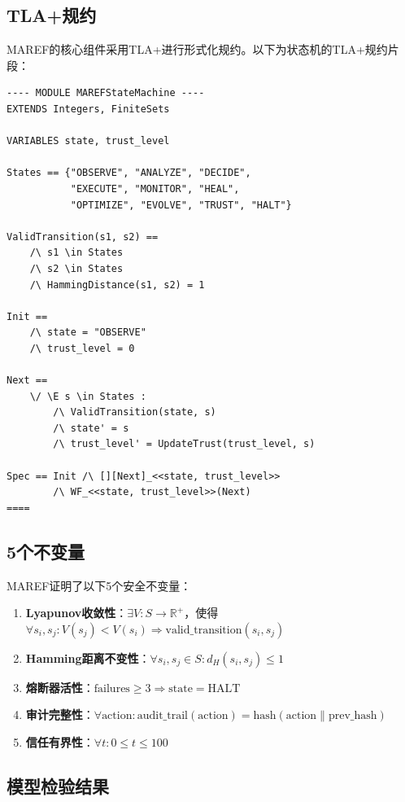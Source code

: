 \subsection{TLA+规约}

MAREF的核心组件采用TLA+进行形式化规约。以下为状态机的TLA+规约片段：

\begin{verbatim}
---- MODULE MAREFStateMachine ----
EXTENDS Integers, FiniteSets

VARIABLES state, trust_level

States == {"OBSERVE", "ANALYZE", "DECIDE", 
           "EXECUTE", "MONITOR", "HEAL",
           "OPTIMIZE", "EVOLVE", "TRUST", "HALT"}

ValidTransition(s1, s2) ==
    /\ s1 \in States
    /\ s2 \in States
    /\ HammingDistance(s1, s2) = 1

Init == 
    /\ state = "OBSERVE"
    /\ trust_level = 0

Next ==
    \/ \E s \in States : 
        /\ ValidTransition(state, s)
        /\ state' = s
        /\ trust_level' = UpdateTrust(trust_level, s)

Spec == Init /\ [][Next]_<<state, trust_level>>
        /\ WF_<<state, trust_level>>(Next)
====
\end{verbatim}

\subsection{5个不变量}

MAREF证明了以下5个安全不变量：

\begin{enumerate}
    \item \textbf{Lyapunov收敛性}：$\exists V: S \rightarrow \mathbb{R}^+$，使得$\forall s_i, s_j: V(s_j) < V(s_i) \Rightarrow \text{valid\_transition}(s_i, s_j)$
    \item \textbf{Hamming距离不变性}：$\forall s_i, s_j \in S: d_H(s_i, s_j) \leq 1$
    \item \textbf{熔断器活性}：$\text{failures} \geq 3 \Rightarrow \text{state} = \text{HALT}$
    \item \textbf{审计完整性}：$\forall \text{action}: \text{audit\_trail}(\text{action}) = \text{hash}(\text{action} \| \text{prev\_hash})$
    \item \textbf{信任有界性}：$\forall t: 0 \leq t \leq 100$
\end{enumerate}

\subsection{模型检验结果}

